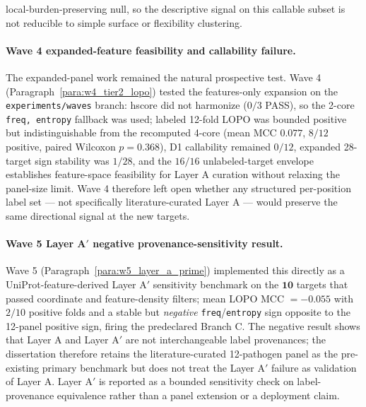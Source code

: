 local-burden-preserving null, so the descriptive signal on this callable subset is not reducible to simple surface or flexibility clustering.

\paragraph{Wave 4 expanded-feature feasibility and callability failure.}
The expanded-panel work remained the natural prospective test. Wave 4 (Paragraph~\ref{para:w4_tier2_lopo}) tested the features-only expansion on the \texttt{experiments/waves} branch: hscore did not harmonize ($0/3$ PASS), so the 2-core \texttt{freq, entropy} fallback was used; labeled 12-fold LOPO was bounded positive but indistinguishable from the recomputed 4-core (mean MCC $0.077$, $8/12$ positive, paired Wilcoxon $p = 0.368$), D1 callability remained $0/12$, expanded 28-target sign stability was $1/28$, and the $16/16$ unlabeled-target envelope establishes feature-space feasibility for Layer A curation without relaxing the panel-size limit. Wave 4 therefore left open whether any structured per-position label set --- not specifically literature-curated Layer A --- would preserve the same directional signal at the new targets.

\paragraph{Wave 5 Layer A$'$ negative provenance-sensitivity result.}
Wave 5 (Paragraph~\ref{para:w5_layer_a_prime}) implemented this directly as a UniProt-feature-derived Layer A$'$ sensitivity benchmark on the $\mathbf{10}$ targets that passed coordinate and feature-density filters; mean LOPO MCC $= -0.055$ with $2/10$ positive folds and a stable but \emph{negative} \texttt{freq}/\texttt{entropy} sign opposite to the 12-panel positive sign, firing the predeclared Branch C. The negative result shows that Layer A and Layer A$'$ are not interchangeable label provenances; the dissertation therefore retains the literature-curated 12-pathogen panel as the pre-existing primary benchmark but does not treat the Layer A$'$ failure as validation of Layer A. Layer A$'$ is reported as a bounded sensitivity check on label-provenance equivalence rather than a panel extension or a deployment claim.

